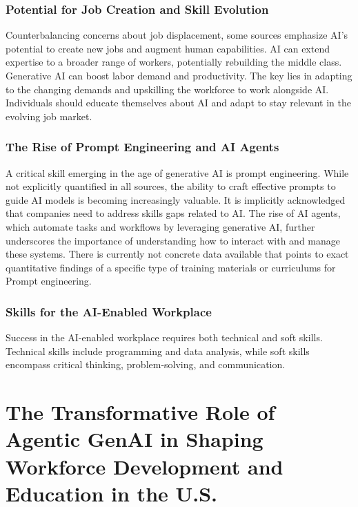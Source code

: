\documentclass[a4paper,headinclude=on,footinclude=on,12pt,oneside]{scrbook}
\begin{document}
\subsection*{Potential for Job Creation and Skill Evolution}

Counterbalancing concerns about job displacement, some sources emphasize AI’s potential to create new jobs and augment human capabilities. AI can extend expertise to a broader range of workers, potentially rebuilding the middle class. Generative AI can boost labor demand and productivity. The key lies in adapting to the changing demands and upskilling the workforce to work alongside AI. Individuals should educate themselves about AI and adapt to stay relevant in the evolving job market.

\subsection*{The Rise of Prompt Engineering and AI Agents}

A critical skill emerging in the age of generative AI is prompt engineering. While not explicitly quantified in all sources, the ability to craft effective prompts to guide AI models is becoming increasingly valuable. It is implicitly acknowledged that companies need to address skills gaps related to AI. The rise of AI agents, which automate tasks and workflows by leveraging generative AI, further underscores the importance of understanding how to interact with and manage these systems. There is currently not concrete data available that points to exact quantitative findings of a specific type of training materials or curriculums for Prompt engineering.

\subsection*{Skills for the AI-Enabled Workplace}

Success in the AI-enabled workplace requires both technical and soft skills. Technical skills include programming and data analysis, while soft skills encompass critical thinking, problem-solving, and communication. 


\chapter{The Transformative Role of Agentic GenAI in Shaping Workforce Development and Education in the U.S.}
\end{document}
